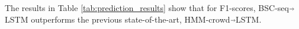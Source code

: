 The results in Table \ref{tab:prediction_results} show that for F1-scores, BSC-seq$\Arrow{.2cm}$LSTM 
outperforms 
the previous state-of-the-art, HMM-crowd$\Arrow{.2cm}$LSTM.
